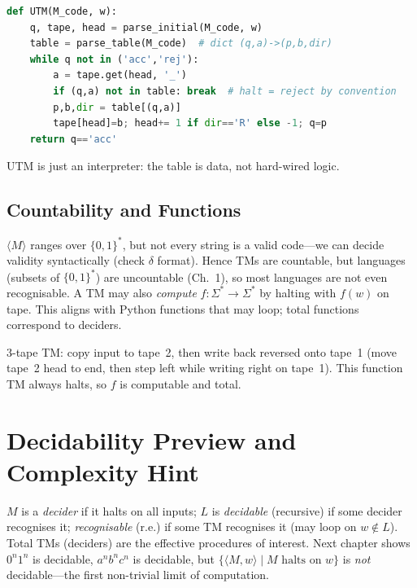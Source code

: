 \begin{example}
\begin{lstlisting}[language=Python]
def UTM(M_code, w):
    q, tape, head = parse_initial(M_code, w)
    table = parse_table(M_code)  # dict (q,a)->(p,b,dir)
    while q not in ('acc','rej'):
        a = tape.get(head, '_')
        if (q,a) not in table: break  # halt = reject by convention
        p,b,dir = table[(q,a)]
        tape[head]=b; head+= 1 if dir=='R' else -1; q=p
    return q=='acc'
\end{lstlisting}
UTM is just an interpreter: the table is data, not hard-wired logic.
\end{example}

\subsection{Countability and Functions}
$\langle M\rangle$ ranges over $\{0,1\}^*$, but not every string is a valid code---we can decide validity syntactically (check $\delta$ format). Hence TMs are countable, but languages (subsets of $\{0,1\}^*$) are uncountable (Ch.~1), so most languages are not even recognisable.
A TM may also \emph{compute} $f:\Sigma^*\to\Sigma^*$ by halting with $f(w)$ on tape. This aligns with Python functions that may loop; total functions correspond to deciders.

\begin{example}[TM computing $f(w)=w^R$]
$3$-tape TM: copy input to tape~2, then write back reversed onto tape~1 (move tape~2 head to end, then step left while writing right on tape~1). This function TM always halts, so $f$ is computable and total.
\end{example}

\section{Decidability Preview and Complexity Hint}
\label{sec:tm-decidable-preview}
$M$ is a \emph{decider} if it halts on all inputs; $L$ is \emph{decidable} (recursive) if some decider recognises it; \emph{recognisable} (r.e.) if some TM recognises it (may loop on $w\notin L$). Total TMs (deciders) are the effective procedures of interest. Next chapter shows $0^n1^n$ is decidable, $a^nb^nc^n$ is decidable, but $\{\langle M,w\rangle\mid M\text{ halts on }w\}$ is \emph{not} decidable---the first non-trivial limit of computation.

